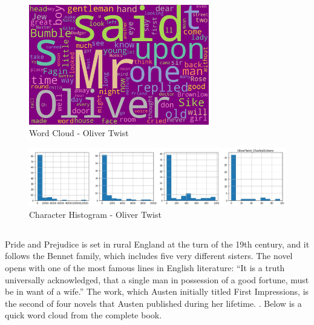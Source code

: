 \begin{figure}[H]
	\begin{center}
		\includegraphics[width = 0.7\textwidth]{Images/OliverTwist_CharlesDickens.jpeg} %
		\caption{Word Cloud - Oliver Twist}
		\label{fig:oliver-twist}
	\end{center}
\end{figure}

\begin{figure}[H]
	\begin{center}
		\includegraphics[width = 1.0\textwidth]{Images/char_hist_OliverTwist_CharlesDickens.jpeg} %
		\caption{Character Histogram - Oliver Twist}
		\label{fig:histogram-olivertwist}
	\end{center}
\end{figure}


\subsection{\textcite{pride-prejudice}} %
\label{sec:pride-prejudice} %

Pride and Prejudice is set in rural England at the turn of the 19th century, and it follows the Bennet family, which includes five very different sisters. The novel opens with one of the most famous lines in English literature: “It is a truth universally acknowledged, that a single man in possession of a good fortune, must be in want of a wife.” The work, which Austen initially titled First Impressions, is the second of four novels that Austen published during her lifetime. \textcite{pride-prejudice-summary}. Below is a quick word cloud from the complete book. 

